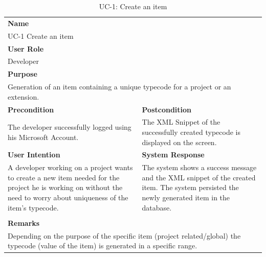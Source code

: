 \begin{table}[H]
    \centering
    \begin{tabular}{|p{}|p{}|}

        \hline
        \multicolumn{2}{|l|}{\rowcolor{gray!50}\textbf{Name}} \\
        \multicolumn{2}{|l|}{UC-1 Create an item} \\ \hline

        \multicolumn{2}{|l|}{\rowcolor{gray!50}\textbf{User Role}} \\
        \multicolumn{2}{|l|}{Developer} \\ \hline

        \multicolumn{2}{|l|}{\rowcolor{gray!50}\textbf{Purpose}} \\
        \multicolumn{2}{|l|}{Generation of an item containing a unique typecode for a project or an extension.} \\ \hline

        \rowcolor{gray!50}\textbf{Precondition} & \rowcolor{gray!50}\textbf{Postcondition} \\
        The developer successfully logged using his Microsoft Account.
         &
        The XML Snippet of the successfully created typecode is displayed on the screen. \\ \hline

        \rowcolor{gray!50}\textbf{User Intention} & \rowcolor{gray!50}\textbf{System Response} \\
        A developer working on a project wants to create a new item needed for the project he is working on without
        the need to worry about uniqueness of the item's typecode.
         &
        The system shows a success message and the XML snippet of the created item.
        The system persisted the newly generated item in the database.
        \\ \hline

         & \\ \hline

        \multicolumn{2}{|l|}{\rowcolor{gray!50}\textbf{Remarks}} \\
        \multicolumn{2}{|p{1\textwidth}|}{Depending on the purpose of the specific item (project related/global) the typecode (value of the item) is generated in a specific range.} \\ \hline
    \end{tabular}
    \caption{UC-1: Create an item}
    \label{tab:uc-1_create-an-item}
\end{table}

